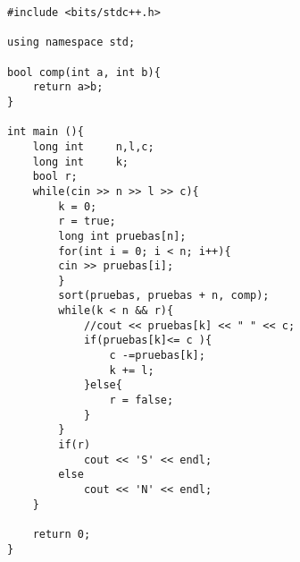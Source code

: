 \begin{verbatim}
#include <bits/stdc++.h>

using namespace std;

bool comp(int a, int b){
	return a>b;
}

int main (){
	long int	 n,l,c;
	long int	 k;
	bool r;
	while(cin >> n >> l >> c){
		k = 0;
		r = true;
		long int pruebas[n];
		for(int i = 0; i < n; i++){
		cin >> pruebas[i];
		}
		sort(pruebas, pruebas + n, comp);
		while(k < n && r){
			//cout << pruebas[k] << " " << c;
			if(pruebas[k]<= c ){
				c -=pruebas[k];
				k += l;
			}else{
				r = false;
			}
		}
		if(r)
			cout << 'S' << endl;
		else
			cout << 'N' << endl;
	}

	return 0;
}

\end{verbatim}
